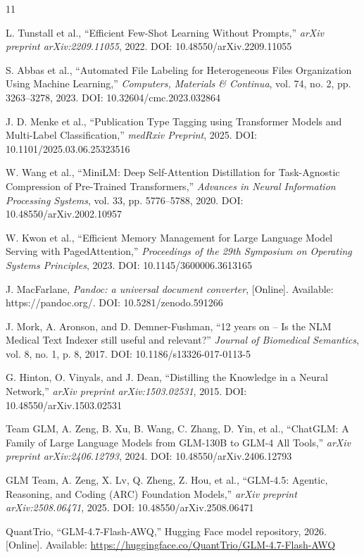 \documentclass[10pt,journal,compsoc]{IEEEtran}
\begin{document}
	\begin{thebibliography}{11}
		
		L. Tunstall et al., ``Efficient Few-Shot Learning Without Prompts,'' \textit{arXiv preprint arXiv:2209.11055}, 2022. DOI: 10.48550/arXiv.2209.11055
		
		S. Abbas et al., ``Automated File Labeling for Heterogeneous Files Organization Using Machine Learning,'' \textit{Computers, Materials \& Continua}, vol. 74, no. 2, pp. 3263--3278, 2023. DOI: 10.32604/cmc.2023.032864
		
		J. D. Menke et al., ``Publication Type Tagging using Transformer Models and Multi-Label Classification,'' \textit{medRxiv Preprint}, 2025. DOI: 10.1101/2025.03.06.25323516
		
		W. Wang et al., ``MiniLM: Deep Self-Attention Distillation for Task-Agnostic Compression of Pre-Trained Transformers,'' \textit{Advances in Neural Information Processing Systems}, vol. 33, pp. 5776--5788, 2020. DOI: 10.48550/arXiv.2002.10957
		
		W. Kwon et al., ``Efficient Memory Management for Large Language Model Serving with PagedAttention,'' \textit{Proceedings of the 29th Symposium on Operating Systems Principles}, 2023. DOI: 10.1145/3600006.3613165
		
		J. MacFarlane, \textit{Pandoc: a universal document converter}, [Online]. Available: https://pandoc.org/. DOI: 10.5281/zenodo.591266
		
		J. Mork, A. Aronson, and D. Demner-Fushman, ``12 years on -- Is the NLM Medical Text Indexer still useful and relevant?'' \textit{Journal of Biomedical Semantics}, vol. 8, no. 1, p. 8, 2017. DOI: 10.1186/s13326-017-0113-5
		
		G. Hinton, O. Vinyals, and J. Dean, ``Distilling the Knowledge in a Neural Network,'' \textit{arXiv preprint arXiv:1503.02531}, 2015. DOI: 10.48550/arXiv.1503.02531
		
		Team GLM, A. Zeng, B. Xu, B. Wang, C. Zhang, D. Yin, et al., ``ChatGLM: A Family of Large Language Models from GLM-130B to GLM-4 All Tools,'' \textit{arXiv preprint arXiv:2406.12793}, 2024. DOI: 10.48550/arXiv.2406.12793
		
		GLM Team, A. Zeng, X. Lv, Q. Zheng, Z. Hou, et al., ``GLM-4.5: Agentic, Reasoning, and Coding (ARC) Foundation Models,'' \textit{arXiv preprint arXiv:2508.06471}, 2025. DOI: 10.48550/arXiv.2508.06471
		
		QuantTrio, ``GLM-4.7-Flash-AWQ,'' Hugging Face model repository, 2026. [Online]. Available: \url{https://huggingface.co/QuantTrio/GLM-4.7-Flash-AWQ}
		
	\end{thebibliography}
	
\end{document}
